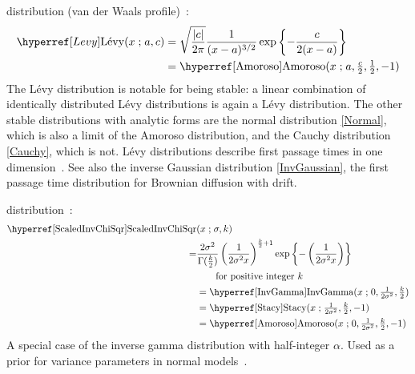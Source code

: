  distribution (van der Waals profile)~\cite{Feller1971}: 
\begin{align}
\label{Levy}
\Levy(x \given a, c) 
&= \sqrt{\frac{|c|}{2\pi}} \frac{1}{(x-a)^{3/2}}  \exp\left\{-\frac{c}{2(x-a)}\right\}  \checked
\\
&=  \opr{Amoroso}(x\given  a, \tfrac{c}{2}, \tfrac{1}{2}, -1) \checked \notag 
\end{align}
The L\'{e}vy distribution is notable for being stable:  a linear combination of identically distributed  L\'{e}vy distributions is again a  L\'{e}vy distribution. The other stable distributions with analytic forms are the normal distribution \eqref{Normal}, which is also a limit of the Amoroso distribution, and the Cauchy distribution \eqref{Cauchy}, which is not. L\'{e}vy distributions describe first passage times in one dimension~\cite{Feller1971}. See also the inverse Gaussian distribution \eqref{InvGaussian}, the  first passage time distribution for Brownian diffusion with drift.


  distribution~\cite{Gelman2004}:
\begin{align}
\label{ScaledInvChiSqr}
\opr{ScaledInvChiSqr}&(x \given \sigma, k) 
\\ \notag =& \frac{2 \sigma^2}{\Gamma(\tfrac{k}{2}) } \left(\frac{1}{2 \sigma^2x}\right)^{\frac{k}{2}+1} 
\exp\left\{-\left( \frac{1}{2 \sigma^2x}   \right)\right\} \checked
\\
&\qquad  \text{for positive integer } k \notag \\
&=  \opr{InvGamma}(x\given 0, \tfrac{1}{2 \sigma^2}, \tfrac{k}{2}) \notag  \checked \\
&= \opr{Stacy}(x\given  \tfrac{1}{2 \sigma ^2},\tfrac{k}{2}, -1)  \notag  \checked \\
&=  \opr{Amoroso}(x\given  0, \tfrac{1}{2 \sigma ^2}, \tfrac{k}{2}, -1) \checked \notag 
\end{align}
A special case of the inverse gamma distribution with half-integer $\alpha$. Used as a prior for variance parameters in normal models~\cite{Gelman2004}.




